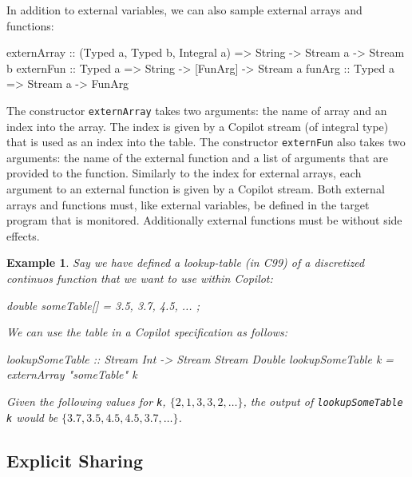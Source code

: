 \documentclass[]{article}
\theoremstyle{example}
\newtheorem{example}{Example}
\begin{document}
In addition to external variables, we can also sample external arrays and functions:
%
\begin{code}
externArray :: (Typed a, Typed b, Integral a) => String -> Stream a -> Stream b
externFun :: Typed a => String -> [FunArg] -> Stream a
funArg :: Typed a => Stream a -> FunArg
\end{code}
%
The constructor \texttt{externArray} takes two arguments: the name of array and an index into the array.
The index is given by a Copilot stream (of integral type) that is used as an index into the table.
The constructor \texttt{externFun} also takes two arguments: the name of the external function and a list of
arguments that are provided to the function. Similarly to the index for external arrays, each argument to
an external function is given by a Copilot stream.
Both external arrays and functions must, like external variables, be defined in the target
program that is monitored. Additionally external functions must be without side effects.

\begin{example}
Say we have defined a lookup-table (in C99) of a discretized continuos function that we want to use
within Copilot:
%
\begin{code}
double someTable[] = { 3.5, 3.7, 4.5, ... };
\end{code}
%
We can use the table in a Copilot specification as follows:
%
\begin{code}
lookupSomeTable :: Stream Int -> Stream Stream Double
lookupSomeTable k = externArray "someTable" k 
\end{code}
%
Given the following values for \texttt{k}, $\{2, 1, 3, 3, 2, \dots \}$, the output of 
\texttt{lookupSomeTable k} would be $\{3.7, 3.5, 4.5, 4.5, 3.7, \dots \}$.
\end{example}

\subsection{Explicit Sharing}
\label{sec:explicit_sharing}
\end{document}
